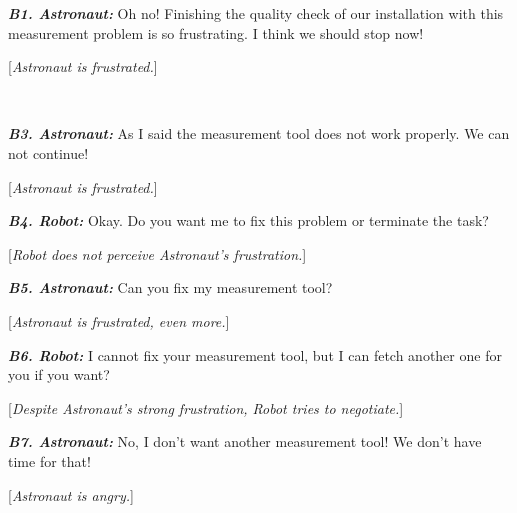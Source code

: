\begin{spacing}{1.2}
\small{
\begin{description}
  \item \textit{\textbf{B1. Astronaut:}} Oh no! Finishing the quality check of
  our installation with this measurement problem is so frustrating. I think we
  should stop now!

  [\textit{Astronaut is frustrated.}]\\

  \item {}\\
  
  \item \textit{\textbf{B3. Astronaut:}} As I said the measurement tool does not
  work properly. We can not continue!

  [\textit{Astronaut is frustrated.}]\\
  
  \item \textit{\textbf{B4. Robot:}} Okay. Do you want me to fix this problem
  or terminate the task?

  [\textit{Robot does not perceive Astronaut's frustration.}]\\

  \item \textit{\textbf{B5. Astronaut:}} Can you fix my measurement tool?
  
  [\textit{Astronaut is frustrated, even more.}]\\
  
  \item \textit{\textbf{B6. Robot:}} I cannot fix your measurement tool, but I
  can fetch another one for you if you want?
  
  [\textit{Despite Astronaut's strong frustration, Robot tries to negotiate.}]\\
  
  \item \textit{\textbf{B7. Astronaut:}} No, I don't want another measurement tool!
  We don't have time for that!
  
  [\textit{Astronaut is angry.}]\\
  

\end{description}}
\end{spacing}
